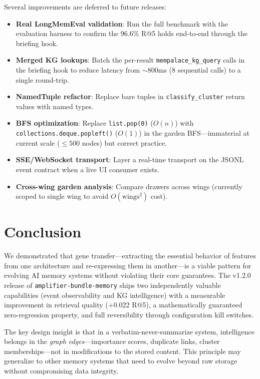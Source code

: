 \documentclass[11pt]{article}
\begin{document}
Several improvements are deferred to future releases:

\begin{itemize}[nosep]
    \item \textbf{Real LongMemEval validation}: Run the full benchmark
          with the evaluation harness to confirm the 96.6\% R@5 holds
          end-to-end through the briefing hook.
    \item \textbf{Merged KG lookups}: Batch the per-result
          \texttt{mempalace\_kg\_query} calls in the briefing hook to
          reduce latency from $\sim$800ms (8 sequential calls) to a
          single round-trip.
    \item \textbf{NamedTuple refactor}: Replace bare tuples in
          \texttt{classify\_cluster} return values with named types.
    \item \textbf{BFS optimization}: Replace \texttt{list.pop(0)}
          ($O(n)$) with \texttt{collections.deque.popleft()} ($O(1)$)
          in the garden BFS---immaterial at current scale ($\leq 500$
          nodes) but correct practice.
    \item \textbf{SSE/WebSocket transport}: Layer a real-time transport
          on the JSONL event contract when a live UI consumer exists.
    \item \textbf{Cross-wing garden analysis}: Compare drawers across
          wings (currently scoped to single wing to avoid $O(\text{wings}^2)$ cost).
\end{itemize}

\section{Conclusion}

We demonstrated that gene transfer---extracting the essential behavior
of features from one architecture and re-expressing them in
another---is a viable pattern for evolving AI memory systems without
violating their core guarantees. The v1.2.0 release of
\texttt{amplifier-bundle-memory} ships two independently valuable
capabilities (event observability and KG intelligence) with a measurable
improvement in retrieval quality ($+0.022$ R@5), a mathematically
guaranteed zero-regression property, and full reversibility through
configuration kill switches.

The key design insight is that in a verbatim-never-summarize system,
intelligence belongs in the \emph{graph edges}---importance scores,
duplicate links, cluster memberships---not in modifications to the
stored content. This principle may generalize to other memory systems
that need to evolve beyond raw storage without compromising data
integrity.
\end{document}
